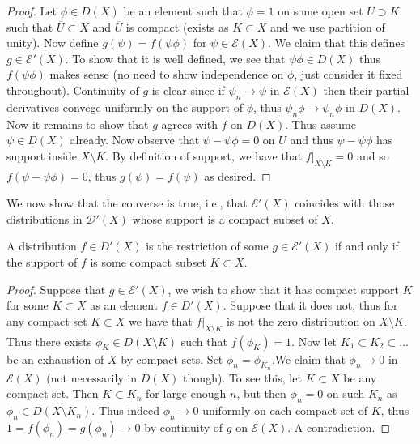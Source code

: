 \documentclass[twoside, a4paper, 10pt]{amsart}
\begin{document}
\begin{proof} Let $\phi \in D(X)$ be an element such that $\phi = 1$ on some open set $U \supset K$ such that $\overline{U} \subset X$ and $\overline{U}$ is compact (exists as $K \subset X$ and we use partition of unity). Now define $g(\psi) = f(\psi \phi)$ for $\psi \in \mathcal{E}(X)$. We claim that this defines $g \in \mathcal{E}'(X)$. To show that it is well defined, we see that $\psi \phi \in D(X)$ thus $f(\psi \phi)$ makes sense (no need to show independence on $\phi$, just consider it fixed throughout). Continuity of $g$ is clear since if $\psi_n \to \psi$ in $\mathcal{E}(X)$ then their partial derivatives convege uniformly on the support of $\phi$, thus $\psi_n\phi \to \psi_n \phi$ in $D(X)$. Now it remains to show that $g$ agrees with $f$ on $D(X)$. Thus assume $\psi \in D(X)$ already. Now observe that $\psi - \psi\phi = 0$ on $\overline{U}$ and thus $\psi - \psi\phi$ has support inside $X \setminus K$.  By definition of support, we have that $f|_{X \setminus K} = 0$ and so $f(\psi - \psi \phi) = 0$, thus $g(\psi) = f(\psi)$ as desired.\end{proof}

We now show that the converse is true, i.e., that $\mathcal{E}'(X)$ coincides with those distributions in $\mathcal{D}'(X)$ whose support is a compact subset of $X$.

\begin{thm} A distribution $f \in D'(X)$ is the restriction of some $g \in \mathcal{E}'(X)$ if and only if the support of $f$ is some compact subset $K \subset X$. 

\end{thm}

\begin{proof} Suppose that $g \in \mathcal{E}'(X)$, we wish to show that it has compact support $K$ for some $K \subset X$ as an element $f \in D'(X)$. Suppose that it does not, thus for any compact set $K \subset X$ we have that $f|_{X \setminus K}$ is not the zero distribution on $X \setminus K$. Thus there exists $\phi_K \in D(X \setminus K)$ such that $f(\phi_K) = 1$. Now let $K_1 \subset K_2 \subset \ldots $ be an exhaustion of $X$ by compact sets. Set $\phi_{n} = \phi_{K_n}$.We claim that $\phi_n \to 0$ in $\mathcal{E}(X)$ (not necessarily in $D(X)$ though). To see this, let $K \subset X$ be any compact set. Then $K \subset K_n$ for large enough $n$, but then $\phi_n = 0$ on such $K_n$ as $\phi_n \in D(X \setminus K_n)$. Thus indeed $\phi_n \to 0$ uniformly on each compact set of $K$, thus $1 = f(\phi_n) = g(\phi_n) \to 0$ by continuity of $g$ on $\mathcal{E}(X)$. A contradiction. \end{proof}
\end{document}
